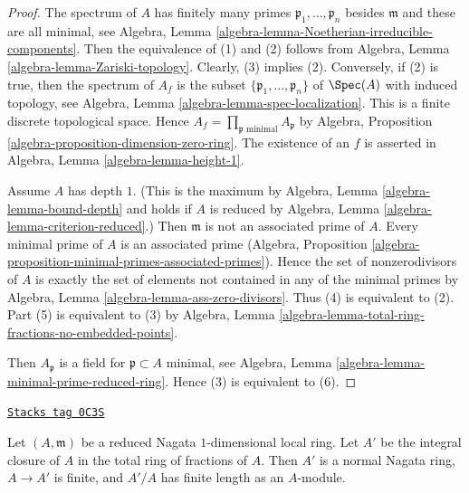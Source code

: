\begin{proof}
The spectrum of $A$ has finitely many primes
$\mathfrak p_1, \ldots, \mathfrak p_n$ besides $\mathfrak m$
and these are all minimal, see
Algebra, Lemma \ref{algebra-lemma-Noetherian-irreducible-components}.
Then the equivalence of (1) and (2) follows from
Algebra, Lemma \ref{algebra-lemma-Zariski-topology}.
Clearly, (3) implies (2). Conversely, if (2) is true,
then the spectrum of $A_f$ is the subset
$\{\mathfrak p_1, \ldots, \mathfrak p_n\}$ of $\Spec(A)$
with induced topology, see
Algebra, Lemma \ref{algebra-lemma-spec-localization}.
This is a finite discrete topological space.
Hence $A_f = \prod_{\mathfrak p\text{ minimal}} A_\mathfrak p$ by
Algebra, Proposition \ref{algebra-proposition-dimension-zero-ring}.
The existence of an $f$ is asserted in
Algebra, Lemma \ref{algebra-lemma-height-1}.

\medskip\noindent
Assume $A$ has depth $1$. (This is the maximum by
Algebra, Lemma \ref{algebra-lemma-bound-depth} and holds if $A$ is reduced by
Algebra, Lemma \ref{algebra-lemma-criterion-reduced}.)
Then $\mathfrak m$ is not an associated prime of $A$.
Every minimal prime of $A$ is an associated prime
(Algebra, Proposition
\ref{algebra-proposition-minimal-primes-associated-primes}).
Hence the set of nonzerodivisors of $A$ is exactly the set of elements
not contained in any of the minimal primes by
Algebra, Lemma \ref{algebra-lemma-ass-zero-divisors}.
Thus (4) is equivalent to (2).
Part (5) is equivalent to (3) by
Algebra, Lemma \ref{algebra-lemma-total-ring-fractions-no-embedded-points}.

\medskip\noindent
Then $A_\mathfrak p$ is a field for
$\mathfrak p \subset A$ minimal, see
Algebra, Lemma \ref{algebra-lemma-minimal-prime-reduced-ring}.
Hence (3) is equivalent to (6).
\end{proof}

\begin{lemma}
\label{varieties-lemma-pre-delta-invariant}
\href{https://stacks.math.columbia.edu/tag/0C3S}{\texttt{Stacks tag 0C3S}}

Let $(A, \mathfrak m)$ be a reduced Nagata $1$-dimensional local ring.
Let $A'$ be the integral closure of $A$ in the total ring of fractions
of $A$. Then $A'$ is a normal Nagata ring, $A \to A'$ is finite, and
$A'/A$ has finite length as an $A$-module.
\end{lemma}


